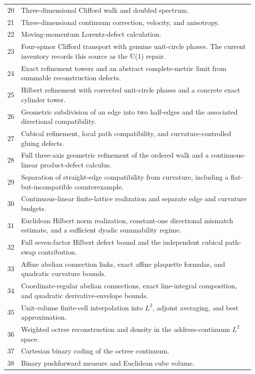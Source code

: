 \begin{longtable}{@{}p{}p{}@{}}
20 & Three-dimensional Clifford walk and doubled spectrum.\\[2pt]
21 & Three-dimensional continuum correction, velocity, and anisotropy.\\[2pt]
22 & Moving-momentum Lorentz-defect calculation.\\[2pt]
23 & Four-spinor Clifford transport with genuine unit-circle phases. The current inventory records this source as the U(1) repair.\\[2pt]
24 & Exact refinement towers and an abstract complete-metric limit from summable reconstruction defects.\\[2pt]
25 & Hilbert refinement with corrected unit-circle phases and a concrete exact cylinder tower.\\[2pt]
26 & Geometric subdivision of an edge into two half-edges and the associated directional compatibility.\\[2pt]
27 & Cubical refinement, local path compatibility, and curvature-controlled gluing defects.\\[2pt]
28 & Full three-axis geometric refinement of the ordered walk and a continuous-linear product-defect calculus.\\[2pt]
29 & Separation of straight-edge compatibility from curvature, including a flat-but-incompatible counterexample.\\[2pt]
30 & Continuous-linear finite-lattice realization and separate edge and curvature budgets.\\[2pt]
31 & Euclidean Hilbert norm realization, constant-one directional mismatch estimate, and a sufficient dyadic summability regime.\\[2pt]
32 & Full seven-factor Hilbert defect bound and the independent cubical path-swap contribution.\\[2pt]
33 & Affine abelian connection links, exact affine plaquette formulas, and quadratic curvature bounds.\\[2pt]
34 & Coordinate-regular abelian connections, exact line-integral composition, and quadratic derivative-envelope bounds.\\[2pt]
35 & Unit-volume finite-cell interpolation into \(L^2\), adjoint averaging, and best approximation.\\[2pt]
36 & Weighted octree reconstruction and density in the address-continuum \(L^2\) space.\\[2pt]
37 & Cartesian binary coding of the octree continuum.\\[2pt]
38 & Binary pushforward measure and Euclidean cube volume.\\[2pt]

\end{longtable}
